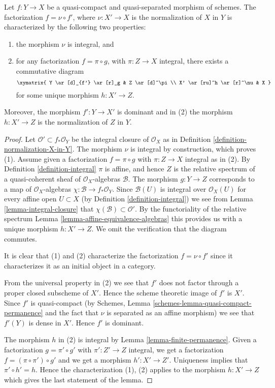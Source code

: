\begin{lemma}
\label{lemma-characterize-normalization}
Let $f : Y \to X$ be a quasi-compact and quasi-separated morphism of schemes.
The factorization $f = \nu \circ f'$, where $\nu : X' \to X$ is the
normalization of $X$ in $Y$ is characterized by the following
two properties:
\begin{enumerate}
\item the morphism $\nu$ is integral, and
\item for any factorization $f = \pi \circ g$, with $\pi : Z \to X$
integral, there exists a commutative diagram
$$
\xymatrix{
Y \ar[d]_{f'} \ar[r]_g & Z \ar[d]^\pi \\
X' \ar[ru]^h \ar[r]^\nu & X
}
$$
for some unique morphism $h : X' \to Z$.
\end{enumerate}
Moreover, the morphism $f' : Y \to X'$ is dominant and in (2) the
morphism $h : X' \to Z$ is the normalization of $Z$ in $Y$.
\end{lemma}

\begin{proof}
Let $\mathcal{O}' \subset f_*\mathcal{O}_Y$ be the integral closure of
$\mathcal{O}_X$ as in Definition \ref{definition-normalization-X-in-Y}.
The morphism $\nu$ is integral by construction, which proves (1).
Assume given a factorization $f = \pi \circ g$ with $\pi : Z \to X$
integral as in (2). By Definition \ref{definition-integral}
$\pi$ is affine, and hence $Z$ is the relative
spectrum of a quasi-coherent sheaf of $\mathcal{O}_X$-algebras $\mathcal{B}$.
The morphism $g : Y \to Z$ corresponds to a map of $\mathcal{O}_X$-algebras
$\chi : \mathcal{B} \to f_*\mathcal{O}_Y$. Since $\mathcal{B}(U)$ is
integral over $\mathcal{O}_X(U)$ for every affine open $U \subset X$
(by Definition \ref{definition-integral})
we see from Lemma \ref{lemma-integral-closure}
that $\chi(\mathcal{B}) \subset \mathcal{O}'$.
By the functoriality of the relative spectrum
Lemma \ref{lemma-affine-equivalence-algebras}
this provides us with a unique morphism
$h : X' \to Z$. We omit the verification that the diagram commutes.

\medskip\noindent
It is clear that (1) and (2) characterize the factorization $f = \nu \circ f'$
since it characterizes it as an initial object in a category.

\medskip\noindent
From the universal property in (2) we see that $f'$ does not factor through
a proper closed subscheme of $X'$. Hence the scheme theoretic image of $f'$
is $X'$. Since $f'$ is quasi-compact (by Schemes, Lemma
\ref{schemes-lemma-quasi-compact-permanence} and the fact that $\nu$ is
separated as an affine morphism) we see that $f'(Y)$ is dense in $X'$.
Hence $f'$ is dominant.

\medskip\noindent
The morphism $h$ in (2) is integral by Lemma \ref{lemma-finite-permanence}.
Given a factorization $g = \pi' \circ g'$ with $\pi' : Z' \to Z$
integral, we get a factorization $f = (\pi \circ \pi') \circ g'$ and
we get a morphism $h' : X' \to Z'$. Uniqueness implies that
$\pi' \circ h' = h$. Hence the characterization (1), (2) applies
to the morphism $h : X' \to Z$ which gives the last statement of the lemma.
\end{proof}

